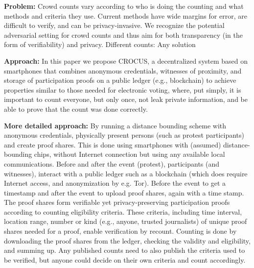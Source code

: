 



\textbf{Problem:}
Crowd counts vary according to who is doing the counting and what
methods and criteria they use. Current methods have wide margins for
error, are difficult to verify, and can be privacy-invasive. We
recognize the potential adversarial setting for crowd counts and thus
aim for both transparency (in the form of verifiability) and
privacy. Different counts: Any solution 

\textbf{Approach:}
 In this paper we propose CROCUS, a decentralized system based on
 smartphones that combines anonymous credentials, witnesses of
 proximity, and storage of participation proofs on a public ledger
 (e.g., blockchain) to achieve properties similar to those needed for
 electronic voting, where, put simply, it is important to count
 everyone, but only once, not leak private information, and be able to
 prove that the count was done correctly. 


\textbf{More detailed approach:} 
By running a distance bounding scheme with anonymous credentials,
physically present persons (such as protest participants) and create proof
shares. This is done using smartphones with (assumed)
distance-bounding chips, without Internet connection but using any
available local communications. Before and after the event (protest), participants (and
witnesses), interact with a public ledger such as a blockchain (which does require
Internet access, and anonymization by e.g. Tor). Before the event to get
a timestamp and after the event to upload proof shares, again with a
time stamp. The proof shares form verifiable yet privacy-preserving
participation proofs according to counting eligibility criteria. These criteria, including
time interval, location range, number or kind (e.g., anyone, trusted
journalists) of unique proof shares
needed for a proof, enable verification by recount. Counting is done
by downloading the proof shares from the ledger, checking the validity
and eligibility, and summing up. Any published counts need to also
publish the criteria used to be verified, but anyone could decide on
their own criteria and count accordingly. 

